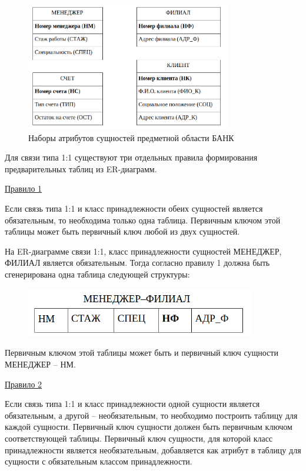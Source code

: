 \begin{enumerate}
    \begin{figure}[H]
        \centering
        \includegraphics[width=0.8\textwidth]{assets/security/pic3.png}
        \caption{Наборы атрибутов сущностей предметной области БАНК}
        \label{fig:mesh05}
    \end{figure}

    Для связи типа 1:1 существуют три отдельных правила формирования предварительных таблиц из ER-диаграмм.

    \underline{Правило 1}

    Если связь типа 1:1 и класс принадлежности обеих сущностей является обязательным, то необходима только одна
    таблица. Первичным ключом этой таблицы может быть первичный ключ любой из двух сущностей.

    На ER-диаграмме связи 1:1, класс принадлежности сущностей МЕНЕДЖЕР, ФИЛИАЛ является обязательным. Тогда согласно
    правилу 1 должна быть сгенерирована одна таблица следующей структуры:

    \begin{figure}[H]
        \centering
        \includegraphics[width=100mm]{assets/security/pic4.png}
        \label{fig:mesh06}
    \end{figure}

    Первичным ключом этой таблицы может быть и первичный ключ сущности МЕНЕДЖЕР – НМ.

    \underline{Правило 2}

    Если связь типа 1:1 и класс принадлежности одной сущности является обязательным, а другой – необязательным,
    то необходимо построить таблицу для каждой сущности. Первичный ключ сущности должен быть первичным ключом
    соответствующей таблицы. Первичный ключ сущности, для которой класс принадлежности является необязательным,
    добавляется как атрибут в таблицу для сущности с обязательным классом принадлежности.


\end{enumerate}
